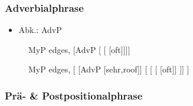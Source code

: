 \begin{frame}
\frametitle{Adverbialphrase}

\begin{itemize}
	\item Abk.: AdvP
\end{itemize}

\begin{figure}[b]
	\begin{minipage}[b]{0.18\textwidth}
	\centering
	\footnotesize{
		\begin{forest}
		MyP edges,
		[AdvP [ []]]
		\end{forest}
		}
  	\end{minipage}  
  	\pause            
	\begin{minipage}[b]{0.03\textwidth}
	\hfill
  	\end{minipage}
	\begin{minipage}[b]{0.41\textwidth}
	\centering
	\footnotesize{
		\begin{forest}
		MyP edges,
		[ [AdvP [sehr,roof]]
			[\alertgreen{AdvP} 
		    [	[]
			]]
		]			 
		\end{forest}
		}
  	\end{minipage}
\end{figure}
\end{frame}


\subsubsection{Prä- \& Postpositionalphrase}

